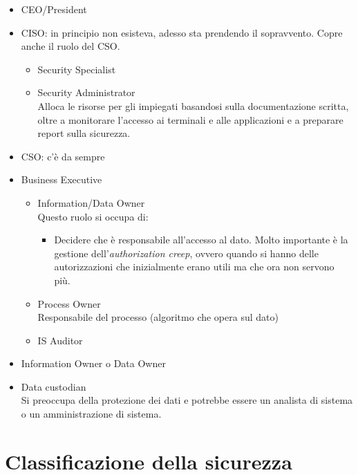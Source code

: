 \begin{itemize}
  \item CEO/President \\
  \item CISO: in principio non esisteva, adesso sta prendendo il sopravvento.
Copre anche il ruolo del CSO.
  \begin{itemize}
        \item Security Specialist
        \item Security Administrator \\
        Alloca le risorse per gli impiegati basandosi sulla documentazione
scritta,
  oltre a monitorare l'accesso ai terminali e alle applicazioni e a preparare
  report sulla sicurezza.
  \end{itemize}
  \item CSO: c'è da sempre
  \item Business Executive
  \begin{itemize}
  \item Information/Data Owner \\
  Questo ruolo si occupa di:
  \begin{itemize}
    \item Decidere che è responsabile all'accesso al dato. Molto importante è
    la gestione dell'\textit{authorization creep}, ovvero quando si hanno delle
    autorizzazioni che inizialmente erano utili ma che ora non servono più.
  \end{itemize}
  \item Process Owner \\
  Responsabile del processo (algoritmo che opera sul dato)
  \item IS Auditor \\
\end{itemize}
  \item Information Owner o Data Owner \\

  \item Data custodian \\
  Si preoccupa della protezione dei dati e potrebbe essere un analista di
  sistema o un amministrazione di sistema.

\end{itemize}

\section{Classificazione della sicurezza}

